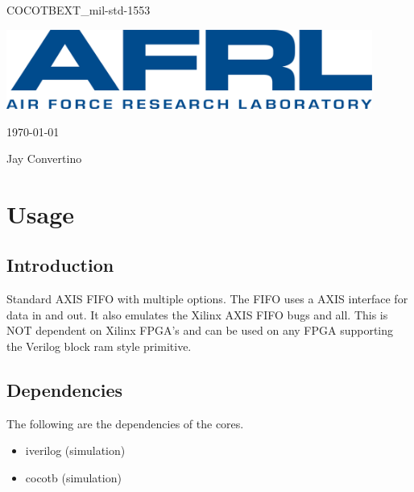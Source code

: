 \begin{titlepage}
  \begin{center}

  {\Huge COCOTBEXT\_mil-std-1553}

  \vspace{25mm}

  \includegraphics[width=0.90\textwidth,height=\textheight,keepaspectratio]{img/AFRL.png}

  \vspace{25mm}

  \today

  \vspace{15mm}

  {\Large Jay Convertino}

  \end{center}
\end{titlepage}

\tableofcontents

\newpage

\section{Usage}

\subsection{Introduction}

\par
Standard AXIS FIFO with multiple options. The FIFO uses a AXIS interface for data in and out.
It also emulates the Xilinx AXIS FIFO bugs and all. This is NOT dependent on Xilinx FPGA's and
can be used on any FPGA supporting the Verilog block ram style primitive.

\subsection{Dependencies}

\par
The following are the dependencies of the cores.

\begin{itemize}
  \item iverilog (simulation)
  \item cocotb (simulation)
\end{itemize}

